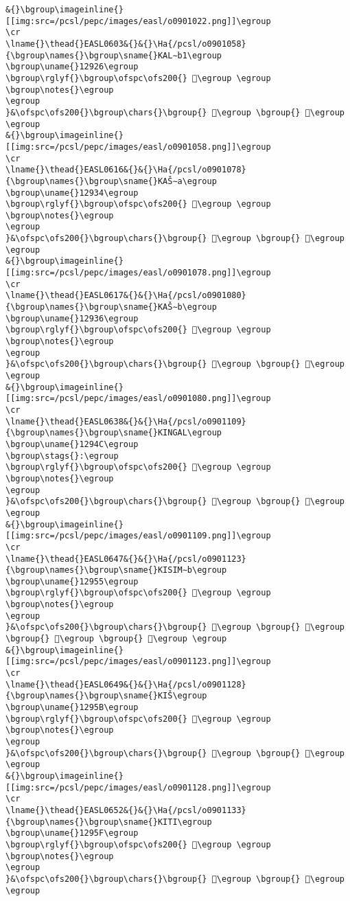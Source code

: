 \begin{verbatim}
&{}\bgroup\imageinline{}[[img:src=/pcsl/pepc/images/easl/o0901022.png]]\egroup
\cr
\lname{}\thead{}EASL0603&{}&{}\Ha{/pcsl/o0901058}{\bgroup\names{}\bgroup\sname{}KAL∼b1\egroup
\bgroup\uname{}12926\egroup
\bgroup\rglyf{}\bgroup\ofspc\ofs200{} 𒤦\egroup \egroup
\bgroup\notes{}\egroup
\egroup
}&\ofspc\ofs200{}\bgroup\chars{}\bgroup{} 𒤦\egroup \bgroup{} 𒤧\egroup \egroup
&{}\bgroup\imageinline{}[[img:src=/pcsl/pepc/images/easl/o0901058.png]]\egroup
\cr
\lname{}\thead{}EASL0616&{}&{}\Ha{/pcsl/o0901078}{\bgroup\names{}\bgroup\sname{}KAŠ∼a\egroup
\bgroup\uname{}12934\egroup
\bgroup\rglyf{}\bgroup\ofspc\ofs200{} 𒤴\egroup \egroup
\bgroup\notes{}\egroup
\egroup
}&\ofspc\ofs200{}\bgroup\chars{}\bgroup{} 𒤵\egroup \bgroup{} 𒤴\egroup \egroup
&{}\bgroup\imageinline{}[[img:src=/pcsl/pepc/images/easl/o0901078.png]]\egroup
\cr
\lname{}\thead{}EASL0617&{}&{}\Ha{/pcsl/o0901080}{\bgroup\names{}\bgroup\sname{}KAŠ∼b\egroup
\bgroup\uname{}12936\egroup
\bgroup\rglyf{}\bgroup\ofspc\ofs200{} 𒤶\egroup \egroup
\bgroup\notes{}\egroup
\egroup
}&\ofspc\ofs200{}\bgroup\chars{}\bgroup{} 𒤸\egroup \bgroup{} 𒤶\egroup \egroup
&{}\bgroup\imageinline{}[[img:src=/pcsl/pepc/images/easl/o0901080.png]]\egroup
\cr
\lname{}\thead{}EASL0638&{}&{}\Ha{/pcsl/o0901109}{\bgroup\names{}\bgroup\sname{}KINGAL\egroup
\bgroup\uname{}1294C\egroup
\bgroup\stags{}:\egroup
\bgroup\rglyf{}\bgroup\ofspc\ofs200{} 𒥌\egroup \egroup
\bgroup\notes{}\egroup
\egroup
}&\ofspc\ofs200{}\bgroup\chars{}\bgroup{} 𒥋\egroup \bgroup{} 𒥌\egroup \egroup
&{}\bgroup\imageinline{}[[img:src=/pcsl/pepc/images/easl/o0901109.png]]\egroup
\cr
\lname{}\thead{}EASL0647&{}&{}\Ha{/pcsl/o0901123}{\bgroup\names{}\bgroup\sname{}KISIM∼b\egroup
\bgroup\uname{}12955\egroup
\bgroup\rglyf{}\bgroup\ofspc\ofs200{} 𒥕\egroup \egroup
\bgroup\notes{}\egroup
\egroup
}&\ofspc\ofs200{}\bgroup\chars{}\bgroup{} 𒥕\egroup \bgroup{} 𒥖\egroup \bgroup{} 𒥗\egroup \bgroup{} 𒥘\egroup \egroup
&{}\bgroup\imageinline{}[[img:src=/pcsl/pepc/images/easl/o0901123.png]]\egroup
\cr
\lname{}\thead{}EASL0649&{}&{}\Ha{/pcsl/o0901128}{\bgroup\names{}\bgroup\sname{}KIŠ\egroup
\bgroup\uname{}1295B\egroup
\bgroup\rglyf{}\bgroup\ofspc\ofs200{} 𒥛\egroup \egroup
\bgroup\notes{}\egroup
\egroup
}&\ofspc\ofs200{}\bgroup\chars{}\bgroup{} 𒥚\egroup \bgroup{} 𒥛\egroup \egroup
&{}\bgroup\imageinline{}[[img:src=/pcsl/pepc/images/easl/o0901128.png]]\egroup
\cr
\lname{}\thead{}EASL0652&{}&{}\Ha{/pcsl/o0901133}{\bgroup\names{}\bgroup\sname{}KITI\egroup
\bgroup\uname{}1295F\egroup
\bgroup\rglyf{}\bgroup\ofspc\ofs200{} 𒥟\egroup \egroup
\bgroup\notes{}\egroup
\egroup
}&\ofspc\ofs200{}\bgroup\chars{}\bgroup{} 𒥞\egroup \bgroup{} 𒥟\egroup \egroup

\end{verbatim}
